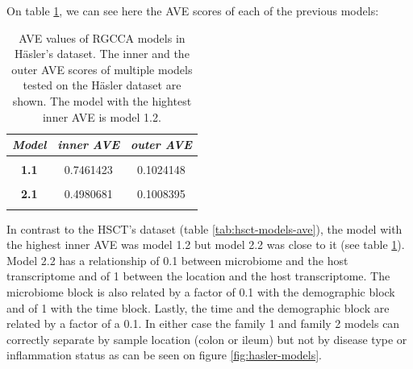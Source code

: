 \documentclass[
  12pt,
  a4paper,
  twoside,
  openright]{book}
\begin{document}
On table \ref{tab:hasler-aves}, we can see here the AVE scores of each of the previous models:

\begin{table}[H]

\caption[AVE values of RGCCA models in Häsler's dataset.]{\label{tab:hasler-aves}AVE values of RGCCA models in Häsler's dataset. The inner and the outer AVE scores of multiple models tested on the Häsler dataset are shown. The model with the hightest inner AVE is model 1.2.}
\centering
\begin{tabular}[t]{|>{}c|c|>{}c|}
\hline
\em{\textbf{Model}} & \em{\textbf{inner AVE}} & \em{\textbf{outer AVE}}\\
\hline
\textbf{\cellcolor{gray!6}{0}} & \cellcolor{gray!6}{0.8217371} & \cellcolor{gray!6}{0.0961236}\\
\hline
\textbf{1.1} & 0.7461423 & 0.1024148\\
\hline
\textbf{\cellcolor{gray!6}{1.2}} & \cellcolor{gray!6}{0.8349410} & \cellcolor{gray!6}{0.1025486}\\
\hline
\textbf{2.1} & 0.4980681 & 0.1008395\\
\hline
\textbf{\cellcolor{gray!6}{2.2}} & \cellcolor{gray!6}{0.7513065} & \cellcolor{gray!6}{0.1009915}\\
\hline
\end{tabular}
\end{table}

In contrast to the HSCT's dataset (table \ref{tab:hsct-models-ave}), the model with the highest inner AVE was model 1.2 but model 2.2 was close to it (see table \ref{tab:hasler-aves}).
Model 2.2 has a relationship of 0.1 between microbiome and the host transcriptome and of 1 between the location and the host transcriptome.
The microbiome block is also related by a factor of 0.1 with the demographic block and of 1 with the time block.
Lastly, the time and the demographic block are related by a factor of a 0.1.
In either case the family 1 and family 2 models can correctly separate by sample location (colon or ileum) but not by disease type or inflammation status as can be seen on figure \ref{fig:hasler-models}.
\end{document}
